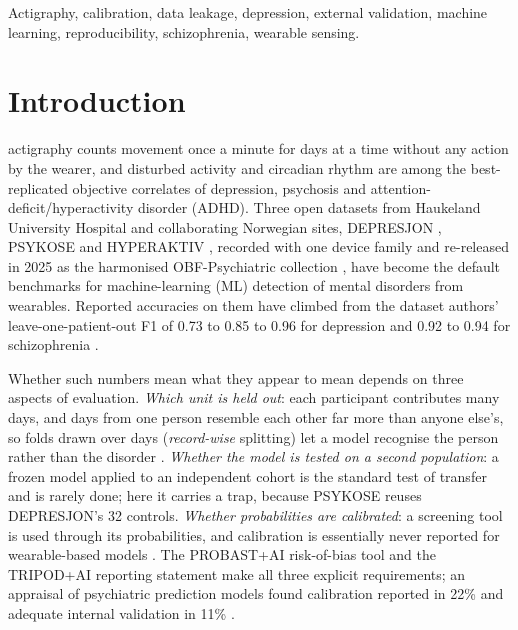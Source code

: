 \documentclass[journal]{IEEEtran}
\begin{document}
\begin{IEEEkeywords}
Actigraphy, calibration, data leakage, depression, external validation, machine learning, reproducibility, schizophrenia, wearable sensing.
\end{IEEEkeywords}

\section{Introduction}
 actigraphy counts movement once a minute for days at a time without any action by the wearer, and disturbed activity and circadian rhythm are among the best-replicated objective correlates of depression, psychosis and attention-deficit/hyperactivity disorder (ADHD). Three open datasets from Haukeland University Hospital and collaborating Norwegian sites, DEPRESJON \cite{garciaceja2018}, PSYKOSE \cite{jakobsen2020} and HYPERAKTIV \cite{hicks2021}, recorded with one device family and re-released in 2025 as the harmonised OBF-Psychiatric collection \cite{obf2025}, have become the default benchmarks for machine-learning (ML) detection of mental disorders from wearables. Reported accuracies on them have climbed from the dataset authors' leave-one-patient-out F1 of 0.73 \cite{garciaceja2018} to 0.85 to 0.96 for depression \cite{jmir2025,arxiv2303,zanella2019} and 0.92 to 0.94 for schizophrenia \cite{psykose_dl2024,psykose_bspc2024}.

Whether such numbers mean what they appear to mean depends on three aspects of evaluation. \emph{Which unit is held out}: each participant contributes many days, and days from one person resemble each other far more than anyone else's, so folds drawn over days (\emph{record-wise} splitting) let a model recognise the person rather than the disorder \cite{saeb2017,jmirai2026}. \emph{Whether the model is tested on a second population}: a frozen model applied to an independent cohort is the standard test of transfer and is rarely done; here it carries a trap, because PSYKOSE reuses DEPRESJON's 32 controls. \emph{Whether probabilities are calibrated}: a screening tool is used through its probabilities, and calibration is essentially never reported for wearable-based models \cite{vancalster2019}. The PROBAST+AI risk-of-bias tool \cite{moons2025} and the TRIPOD+AI reporting statement \cite{collins2024} make all three explicit requirements; an appraisal of psychiatric prediction models found calibration reported in 22\% and adequate internal validation in 11\% \cite{meehan2022}.
\end{document}

